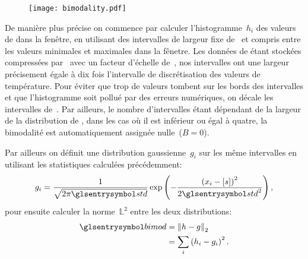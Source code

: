 \begin{figure}
  \centering
  \texttt{[image: bimodality.pdf]}
  \label{fig:bimodality}
\end{figure}

De manière plus précise on commence par calculer l'histogramme~\(h_i\) des valeurs de  dans la fenêtre, en utilisant des intervalles de largeur fixe de~ et compris entre les valeurs minimales et maximales dans la fênetre.
Les données de  étant stockées compressées par \footnotemark\ avec un facteur d'échelle de~, nos intervalles ont une largeur précisement égale à dix fois l'intervalle de discrétisation des valeurs de température.
Pour éviter que trop de valeurs tombent sur les bords des intervalles et que l'histogramme soit pollué par des erreurs numériques, on décale les intervalles de~.
Par ailleurs, le nombre d'intervalles étant dépendant de la largeur de la distribution de , dans les cas où il est inférieur ou égal à quatre, la bimodalité est automatiquement assignée nulle~(\(B=0\)).

Par ailleurs on définit une distribution gaussienne~\(g_i\) sur les même intervalles en utilisant les statistiques calculées précédemment:
\begin{equation}
  g_i = \frac{1}{\sqrt{2\pi\am{std}}} \exp\paren{-\frac{\paren{x_i-\moy{s}}^2}{2\am{std}^2}},
\end{equation}
pour ensuite calculer la norme~\(\mathbb{L}^2\) entre les deux distributions:
\begin{equation}
  \begin{split}
  \am{bimod} & = \norme[2]{h - g}\\
             & = \sum_i \paren{h_i - g_i}^2 .
  \end{split}
\end{equation}

